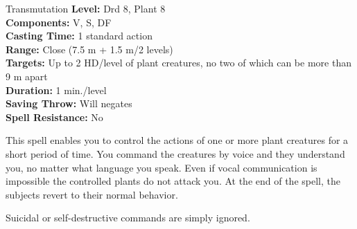 {Transmutation}
{
	\textbf{Level:}
	Drd 8, Plant 8\\
	\textbf{Components:}
	V, S, DF\\
	\textbf{Casting Time:}
	1 standard action\\
	\textbf{Range:}
	Close (7.5 m + 1.5 m/2 levels)\\
	\textbf{Targets:}
	Up to 2 HD/level of plant creatures, no two of which can be more than 9 m apart\\
	\textbf{Duration:}
	1 min./level\\
	\textbf{Saving Throw:}
	Will negates\\
	\textbf{Spell Resistance:}
	No\\
}
{
	This spell enables you to control the actions of one or more plant creatures for a short period of time. You command the creatures by voice and they understand you, no matter what language you speak. Even if vocal communication is impossible  the controlled plants do not attack you. At the end of the spell, the subjects revert to their normal behavior.

	Suicidal or self-destructive commands are simply ignored.

}
